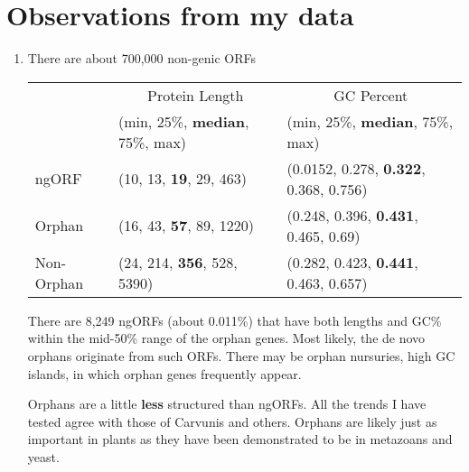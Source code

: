 \section{Observations from my data}

\begin{enumerate}
\item There are about 700,000 non-genic ORFs

\begin{table}[ht]
\centering
\begin{tabular}{|l|l|l|}
    \hline
    {} & \multicolumn{1}{c|}{Protein Length} & \multicolumn{1}{c|}{GC Percent}\\ 
    {} & (min, 25\%, \textbf{median}, 75\%, max) & (min, 25\%, \textbf{median}, 75\%, max) \\
    \hline
    ngORF & (10, 13, \textbf{19}, 29, 463) & (0.0152, 0.278, \textbf{0.322}, 0.368, 0.756) \\ 
    Orphan & (16, 43, \textbf{57}, 89, 1220) & (0.248, 0.396, \textbf{0.431}, 0.465, 0.69) \\ 
    Non-Orphan & (24, 214, \textbf{356}, 528, 5390) & (0.282, 0.423, \textbf{0.441}, 0.463, 0.657) \\ 
    \hline
\end{tabular}
\end{table}

There are 8,249 ngORFs (about 0.011\%) that have both lengths and GC\% within
the mid-50\% range of the orphan genes. Most likely, the de novo orphans
originate from such ORFs. There may be orphan nursuries, high GC islands, in
which orphan genes frequently appear. 

Orphans are a little \textbf{less} structured than ngORFs. All the trends I
have tested agree with those of Carvunis \cite{carvunis_proto-genes_2012} and
others. Orphans are likely just as important in plants as they have been
demonstrated to be in metazoans and yeast.

\end{enumerate}

